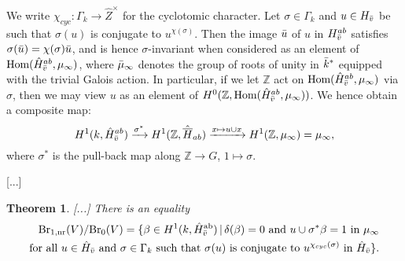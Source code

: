 \documentclass[10pt,letterpaper,twoside]{article}
\renewcommand{\1}{\mathbf{1}}
\newcommand{\nr}{\mathrm{nr}}
\newcommand{\Br}{\mathrm{Br}}
\theoremstyle{plain}
\newtheorem{theorem}{Theorem}[section]
\theoremstyle{plain}
\theoremstyle{definition}
\theoremstyle{named}
\theoremstyle{definition}
\begin{document}
	
	We write $\chi_{cyc}:\Gamma_k\to \hat{Z}^\times$ for the cyclotomic character. Let $\sigma \in \Gamma_k$ and $u \in H_{\Bar{v}}$ be such that $\sigma(u)$ is conjugate to $u^{\chi(\sigma)}$. Then the image $\Bar{u}$ of $u$ in $H^{ab}_{\Bar{v}}$ satisfies $\sigma(\Bar{u}) = \chi(\sigma)\Bar{u}$, and is hence $\sigma$-invariant when considered as an element of $\text{Hom}(\hat{H}^{ab}_{\Bar{v}}, \mu_\infty)$, where $\Bar{\mu}_\infty$ denotes the group of roots of unity in $\Bar{k}^*$ equipped with the trivial Galois action. In particular, if we let $\mathbb{Z}$ act on $\text{Hom}(\hat{H}^{ab}_{\Bar{v}}, \mu_\infty)$ via $\sigma$, then we may view $u$ as an element of $H^0(\mathbb{Z}, \text{Hom}(\hat{H}^{ab}_{\Bar{v}}, \mu_\infty))$. We hence obtain a composite map:
	\[
	H^1(k, \hat{H}^{ab}_{\Bar{v}}) \xrightarrow{\sigma^*} H^1(\mathbb{Z}, \hat{\overline{H}}_{ab}) \xrightarrow{x \mapsto u \cup x} H^1(\mathbb{Z}, \mu_\infty) = \mu_\infty,
	\]
	where $\sigma^*$ is the pull-back map along $\mathbb{Z} \rightarrow G$, $1 \mapsto \sigma$.
	
	[...]
	
	
	\begin{theorem}\label{brauer-homogeneous}[...]
		There is an equality
		\begin{align*}
			\Br_{1,\nr}(V)/\Br_0(V) = \{\beta \in H^1(k, \hat{H}^{\mathrm{ab}}_{\Bar{v}}) \,|\, \delta(\beta) = 0 \text{ and } u \cup \sigma^*\beta = 1 \text{ in $\mu_\infty$}\\
			\text{for all $u \in \hat{H}_{\Bar{v}}$ and $\sigma \in \Gamma_k$ such that $\sigma(u)$ is conjugate to $u^{\chi_{cyc}(\sigma)}$ in $\hat{H}_{\Bar{v}}$}\}.
		\end{align*}
	\end{theorem}
	
\end{document}
